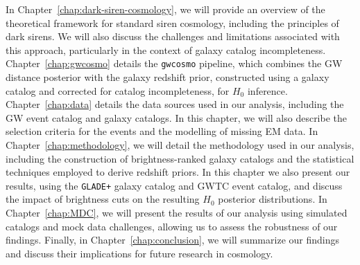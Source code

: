 In Chapter~\ref{chap:dark-siren-cosmology}, we will provide an overview of the theoretical framework for standard siren cosmology, including the principles of dark sirens. We will also discuss the challenges and limitations associated with this approach, particularly in the context of galaxy catalog incompleteness. Chapter~\ref{chap:gwcosmo} details the \texttt{gwcosmo} pipeline, which combines the \ac{GW} distance posterior with the galaxy redshift prior, constructed using a galaxy catalog and corrected for catalog incompleteness, for $H_0$ inference. Chapter~\ref{chap:data} details the data sources used in our analysis, including the \ac{GW} event catalog and galaxy catalogs. In this chapter, we will also describe the selection criteria for the events and the modelling of missing \ac{EM} data. In Chapter~\ref{chap:methodology}, we will detail the methodology used in our analysis, including the construction of brightness-ranked galaxy catalogs and the statistical techniques employed to derive redshift priors. In this chapter we also present our results, using the \texttt{GLADE+} galaxy catalog and \acs{GWTC} event catalog, and discuss the impact of brightness cuts on the resulting $H_0$ posterior distributions. In Chapter~\ref{chap:MDC}, we will present the results of our analysis using simulated catalogs and mock data challenges, allowing us to assess the robustness of our findings. Finally, in Chapter~\ref{chap:conclusion}, we will summarize our findings and discuss their implications for future research in cosmology.
